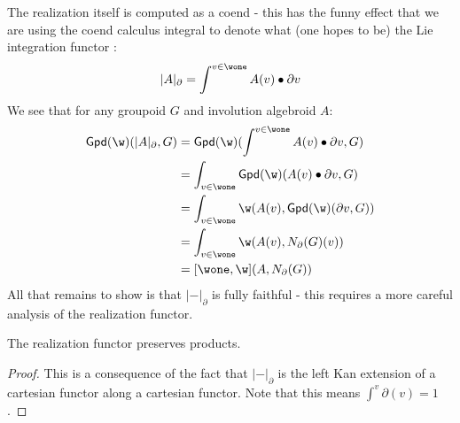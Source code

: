 The realization itself is computed as a coend - this has the funny effect that we are using the coend calculus integral to denote what (one hopes to be) the Lie integration functor :
\[
	|A|_\partial = \int ^{v \in \wone} A(v)\bullet \partial v 
\]
We see that for any groupoid $G$ and involution algebroid $A$:
\begin{align*}
	\mathsf{Gpd}(\w)(|A|_\partial, G)
	&= \mathsf{Gpd}(\w)(\int ^{v \in \wone} A(v)\bullet \partial v, G) \\
	&= \int_{v \in \wone} \mathsf{Gpd}(\w)( A(v)\bullet \partial v, G) \\
	&= \int_{v \in \wone} \w(A(v), \mathsf{Gpd}(\w)( \partial v, G)) \\
	&= \int_{v \in \wone} \w(A(v), N_{\partial}(G)(v)) \\
	&= [\wone,\w](A, N_{\partial}(G))
\end{align*}
All that remains to show is that $|-|_\partial$ is fully faithful - this requires a more careful analysis of the realization functor.
\begin{lemma}
	The realization functor preserves products.
\end{lemma}
\begin{proof}
	This is a consequence of the fact that $|-|_\partial$ is the left Kan extension of a cartesian functor along a cartesian functor.
	Note that this means $\int^v\partial(v) = 1$.
\end{proof}

